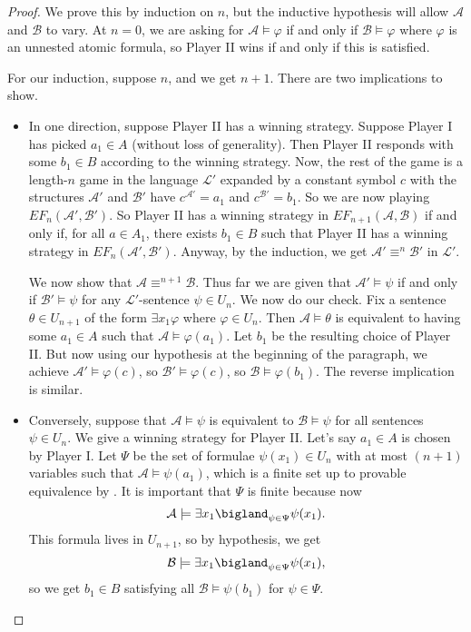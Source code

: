 \documentclass[../notes.tex]{subfiles}
\begin{document}
\begin{proof}
	We prove this by induction on $n$, but the inductive hypothesis will allow $\mathcal A$ and $\mathcal B$ to vary. At $n=0$, we are asking for $\mathcal A\models\varphi$ if and only if $\mathcal B\models\varphi$ where $\varphi$ is an unnested atomic formula, so Player II wins if and only if this is satisfied.

	For our induction, suppose $n$, and we get $n+1$. There are two implications to show.
	\begin{itemize}
		\item In one direction, suppose Player II has a winning strategy. Suppose Player I has picked $a_1\in A$ (without loss of generality). Then Player II responds with some $b_1\in B$ according to the winning strategy. Now, the rest of the game is a length-$n$ game in the language $\mathcal L'$ expanded by a constant symbol $c$ with the structures $\mathcal A'$ and $\mathcal B'$ have $c^{\mathcal A'}=a_1$ and $c^{\mathcal B'}=b_1$. So we are now playing $EF_n(\mathcal A',\mathcal B')$. So Player II has a winning strategy in $EF_{n+1}(\mathcal A,\mathcal B)$ if and only if, for all $a\in A_1$, there exists $b_1\in B$ such that Player II has a winning strategy in $EF_{n}(\mathcal A',\mathcal B')$. Anyway, by the induction, we get $\mathcal A'\equiv^n\mathcal B'$ in $\mathcal L'$.

		We now show that $\mathcal A\equiv^{n+1}\mathcal B$. Thus far we are given that $\mathcal A'\models\psi$ if and only if $\mathcal B'\models\psi$ for any $\mathcal L'$-sentence $\psi\in U_n$. We now do our check. Fix a sentence $\theta\in U_{n+1}$ of the form $\exists x_1\varphi$ where $\varphi\in U_n$. Then $\mathcal A\models\theta$ is equivalent to having some $a_1\in A$ such that $\mathcal A\models\varphi(a_1)$. Let $b_1$ be the resulting choice of Player II. But now using our hypothesis at the beginning of the paragraph, we achieve $\mathcal A'\models\varphi(c)$, so $\mathcal B'\models\varphi(c)$, so $\mathcal B\models\varphi(b_1)$. The reverse implication is similar.

		\item Conversely, suppose that $\mathcal A\models\psi$ is equivalent to $\mathcal B\models\psi$ for all sentences $\psi\in U_n$. We give a winning strategy for Player II. Let's say $a_1\in A$ is chosen by Player I. Let $\Psi$ be the set of formulae $\psi(x_1)\in U_n$ with at most $(n+1)$ variables such that $\mathcal A\models\psi(a_1)$, which is a finite set up to provable equivalence by . It is important that $\Psi$ is finite because now
		\[\mathcal A\models\exists x_1\bigland_{\psi\in\Psi}\psi(x_1).\]
		This formula lives in $U_{n+1}$, so by hypothesis, we get
		\[\mathcal B\models\exists x_1\bigland_{\psi\in\Psi}\psi(x_1),\]
		so we get $b_1\in B$ satisfying all $\mathcal B\models\psi(b_1)$ for $\psi\in\Psi$.
	

\end{itemize}
\end{proof}
\end{document}
